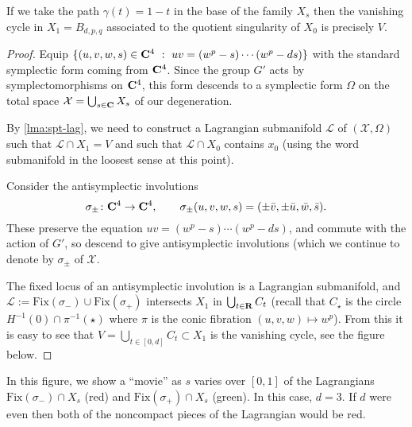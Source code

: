 \documentclass{article}
\begin{document}
\begin{Lemma}
If we take the path \(\gamma(t)=1-t\) in the base of the family
\(X_s\) then the vanishing cycle in \(X_1=B_{d,p,q}\) associated to
the quotient singularity of \(X_0\) is precisely \(V\).
\end{Lemma}
\begin{proof}
Equip \(\{(u,v,w,s)\in\CC^4\ :\ uv=(w^p-s)\cdots(w^p-ds)\}\) with
the standard symplectic form coming from \(\mathbf{C}^4\). Since the group
\(G'\) acts by symplectomorphisms on \(\mathbf{C}^4\), this form descends
to a symplectic form \(\Omega\) on the total space
\(\mathcal{X}=\bigcup_{s\in\mathbf{C}}X_s\) of our degeneration.


By \cref{lma:spt-lag}, we need to construct a Lagrangian submanifold
\(\mathcal{L}\) of \((\mathcal{X},\Omega)\) such that
\(\mathcal{L}\cap X_1=V\) and such that \(\mathcal{L}\cap X_0\)
contains \(x_0\) (using the word submanifold in the loosest sense at
this point).


Consider the antisymplectic involutions
\[\sigma_{\pm}\colon\mathbf{C}^4\to\mathbf{C}^4,\qquad\sigma_{\pm}(u,v,w,s)=(\pm\bar{v},\pm\bar{u},\bar{w},\bar{s}).\]
These preserve the equation \(uv=(w^p-s)\cdots(w^p-ds)\), and
commute with the action of \(G'\), so descend to give antisymplectic
involutions (which we continue to denote by \(\sigma_{\pm}\) of
\(\mathcal{X}\).


The fixed locus of an antisymplectic involution is a Lagrangian
submanifold, and
\(\mathcal{L}:=\mathrm{Fix}(\sigma_{-})\cup\mathrm{Fix}(\sigma_+)\)
intersects \(X_1\) in \(\bigcup_{t\in\mathbf{R}}C_t\) (recall that
\(C_{\star}\) is the circle \(H^{-1}(0)\cap\pi^{-1}(\star)\) where
\(\pi\) is the conic fibration \((u,v,w)\mapsto w^p\)). From this it
is easy to see that \(V=\bigcup_{t\in[0,d]}C_t\subset X_1\) is the
vanishing cycle, see the figure below. \qedhere


\end{proof}
In this figure, we show a ``movie'' as \(s\) varies over \([0,1]\) of
the Lagrangians \(\mathrm{Fix}(\sigma_-)\cap X_s\) (red) and
\(\mathrm{Fix}(\sigma_+)\cap X_s\) (green). In this case, \(d=3\). If
\(d\) were even then both of the noncompact pieces of the Lagrangian
would be red.
\end{document}
